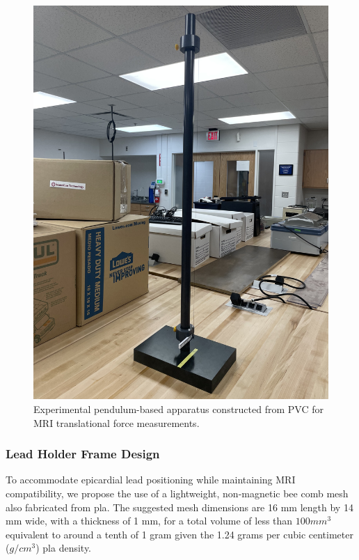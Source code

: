 \begin{figure}[H]
\begin{minipage}[b]{0.48\textwidth}
		\includegraphics[width=1.3\textwidth, angle=-90]{Assests/Picture1.jpg}
	\end{minipage}
	\caption{Experimental pendulum-based apparatus constructed from PVC for MRI translational force measurements.}
	\label{fig:schematic}
\end{figure}

\subsubsection*{Lead Holder Frame Design}

To accommodate epicardial lead positioning while maintaining MRI compatibility, we propose the use of a lightweight, non-magnetic bee comb mesh also fabricated from \gls{pla}. The suggested mesh dimensions are 16 mm length by 14 mm wide, with a thickness of 1 mm, for a total volume of less than $100 mm^3$ equivalent to around a tenth of 1 gram given the 1.24 grams per cubic centimeter ($g/cm^3$) \gls{pla} density. 

